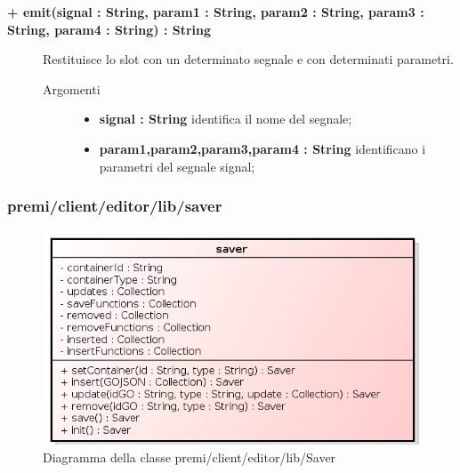 \begin{description}
	\begin{description}
		\item[\textbf{\color{blue}+ emit(signal : String, param1 : String, param2 : String, param3 : String, param4 : String) : String			}] \hfill
			Restituisce lo slot con un determinato segnale e con determinati parametri.
			
		\begin{description}
			\item[Argomenti] \hfill
				\begin{itemize}
				
					\item \textbf{signal : String			} \hfill
					identifica il nome del segnale;
					\item \textbf{param1,param2,param3,param4 : String			} \hfill
					identificano i parametri del segnale signal;			
				\end{itemize}
		\end{description}
	\end{description}		
	
	
\end{description}

\subsubsection{premi/client/editor/lib/saver}
\begin{figure}[h]
\begin{center}
\includegraphics[scale=0.90]{img/diacla/Saver.png}
\caption{Diagramma della classe premi/client/editor/lib/Saver}
\end{center}
\end{figure} 
 
